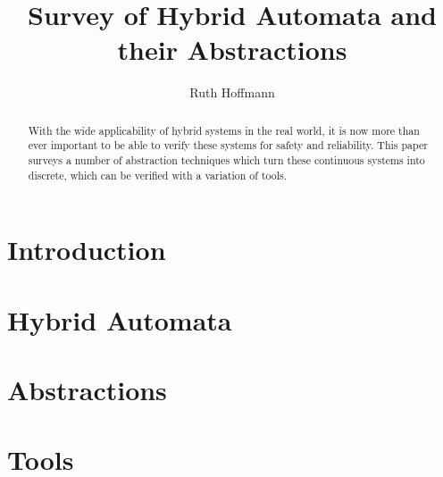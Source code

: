 \documentclass{article}
\title{Survey of Hybrid Automata and their Abstractions}
\author{Ruth Hoffmann}
\begin{document}
\maketitle


\begin{abstract}
With the wide applicability of hybrid systems in the real world, it is now more than ever important to be able to verify these systems for safety and reliability. This paper surveys a number of abstraction techniques which turn these continuous systems into discrete, which can be verified with a variation of tools.
\end{abstract}

\section{Introduction}
\label{sec:intro}


\section{Hybrid Automata}
\label{sec:hybrid}


\section{Abstractions}
\label{sec:abs}



\section{Tools}
\label{sec:tools}



%
%

\end{document}
